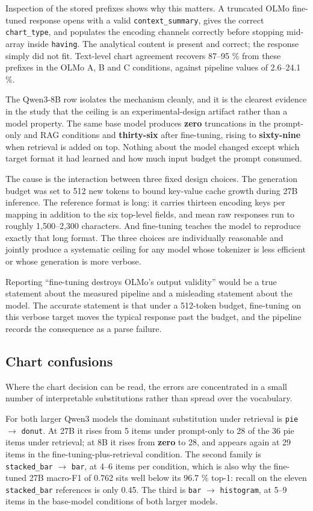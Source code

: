 Inspection of the stored prefixes shows why this matters. A truncated OLMo fine-tuned response opens with a valid \texttt{context\_summary}, gives the correct \texttt{chart\_type}, and populates the encoding channels correctly before stopping mid-array inside \texttt{having}. The analytical content is present and correct; the response simply did not fit. Text-level chart agreement recovers 87--95 \% from these prefixes in the OLMo A, B and C conditions, against pipeline values of 2.6--24.1 \%.

The Qwen3-8B row isolates the mechanism cleanly, and it is the clearest evidence in the study that the ceiling is an experimental-design artifact rather than a model property. The same base model produces \textbf{zero} truncations in the prompt-only and RAG conditions and \textbf{thirty-six} after fine-tuning, rising to \textbf{sixty-nine} when retrieval is added on top. Nothing about the model changed except which target format it had learned and how much input budget the prompt consumed.

The cause is the interaction between three fixed design choices. The generation budget was set to 512 new tokens to bound key-value cache growth during 27B inference. The reference format is long: it carries thirteen encoding keys per mapping in addition to the six top-level fields, and mean raw responses run to roughly 1,500--2,300 characters. And fine-tuning teaches the model to reproduce exactly that long format. The three choices are individually reasonable and jointly produce a systematic ceiling for any model whose tokenizer is less efficient or whose generation is more verbose.

Reporting ``fine-tuning destroys OLMo's output validity'' would be a true statement about the measured pipeline and a misleading statement about the model. The accurate statement is that under a 512-token budget, fine-tuning on this verbose target moves the typical response past the budget, and the pipeline records the consequence as a parse failure.

\subsection{Chart confusions}

Where the chart decision can be read, the errors are concentrated in a small number of interpretable substitutions rather than spread over the vocabulary.

For both larger Qwen3 models the dominant substitution under retrieval is \texttt{pie} \(\rightarrow\) \texttt{donut}. At 27B it rises from 5 items under prompt-only to 28 of the 36 pie items under retrieval; at 8B it rises from \textbf{zero} to 28, and appears again at 29 items in the fine-tuning-plus-retrieval condition. The second family is \texttt{stacked\_bar} \(\rightarrow\) \texttt{bar}, at 4--6 items per condition, which is also why the fine-tuned 27B macro-F1 of 0.762 sits well below its 96.7 \% top-1: recall on the eleven \texttt{stacked\_bar} references is only 0.45. The third is \texttt{bar} \(\rightarrow\) \texttt{histogram}, at 5--9 items in the base-model conditions of both larger models.

